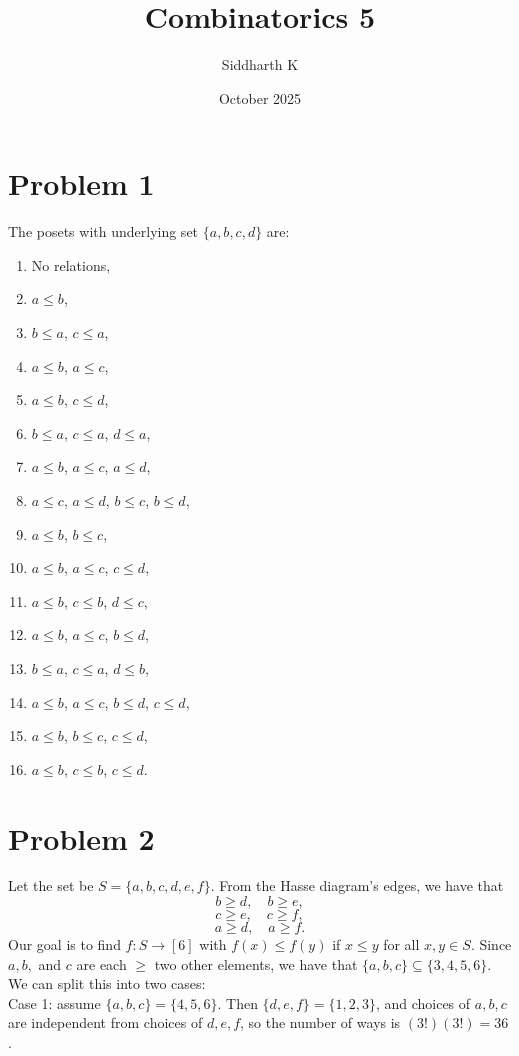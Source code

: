 \documentclass{article}
\title{Combinatorics 5}
\author{Siddharth K}
\date{October 2025}
\begin{document}
\maketitle

\section*{Problem 1}
The posets with underlying set $\{a, b, c, d\}$ are:
\begin{enumerate}
    \item No relations,
    \item $a \le b$,
    \item $b \le a$, $c \le a$,
    \item $a \le b$, $a \le c$,
    \item $a \le b$, $c \le d$,
    \item $b \le a$, $c \le a$, $d \le a$,
    \item $a \le b$, $a \le c$, $a \le d$,
    \item $a \le c$, $a \le d$, $b \le c$, $b \le d$,
    \item $a \le b$, $b \le c$,
    \item $a \le b$, $a \le c$, $c \le d$,
    \item $a \le b$, $c \le b$, $d \le c$,
    \item $a \le b$, $a \le c$, $b \le d$,
    \item $b \le a$, $c \le a$, $d \le b$,
    \item $a \le b$, $a \le c$, $b \le d$, $c \le d$,
    \item $a \le b$, $b \le c$, $c \le d$,
    \item $a \le b$, $c \le b$, $c \le d$.
\end{enumerate}

\section*{Problem 2}

Let the set be $S = \{a, b, c, d, e, f\}$. From the Hasse diagram's edges, we have that
$$b \ge d, \quad b \ge e,$$
$$c \ge e, \quad c \ge f,$$
$$a \ge d, \quad a \ge f.$$
Our goal is to find $f: S\to [6]$ with $f(x) \le f(y)$ if $x \le y$ for all $x, y \in S$. Since $a, b,$ and $c$ are each $\ge$ two other elements, we have that $\{a, b, c\} \subseteq \{3, 4, 5, 6\}$. We can split this into two cases: \\

Case 1: assume $\{a, b, c\} = \{4, 5, 6\}$. Then $\{d, e, f\} = \{1, 2, 3\}$, and choices of $a, b, c$ are independent from choices of $d, e, f$, so the number of ways is $(3!)(3!) = 36$. \\
\end{document}
